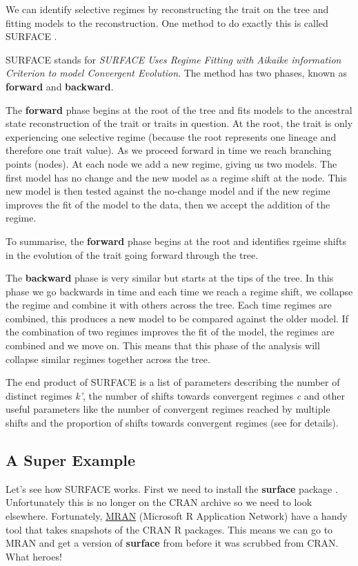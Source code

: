 \documentclass[
]{book}
\begin{document}
We can identify selective regimes by reconstructing the trait on the tree and fitting models to the reconstruction. One method to do exactly this is called SURFACE \citep{surface}.

SURFACE stands for \emph{SURFACE Uses Regime Fitting with Aikaike information Criterion to model Convergent Evolution}. The method has two phases, known as \textbf{forward} and \textbf{backward}.

The \textbf{forward} phase begins at the root of the tree and fits models to the ancestral state reconstruction of the trait or traits in question. At the root, the trait is only experiencing one selective regime (because the root represents one lineage and therefore one trait value). As we proceed forward in time we reach branching points (nodes). At each node we add a new regime, giving us two models. The first model has no change and the new model as a regime shift at the node. This new model is then tested against the no-change model and if the new regime improves the fit of the model to the data, then we accept the addition of the regime.

To summarise, the \textbf{forward} phase begins at the root and identifies rgeime shifts in the evolution of the trait going forward through the tree.

The \textbf{backward} phase is very similar but starts at the tips of the tree. In this phase we go backwards in time and each time we reach a regime shift, we collapse the regime and combine it with others across the tree. Each time regimes are combined, this produces a new model to be compared against the older model. If the combination of two regimes improves the fit of the model, the regimes are combined and we move on. This means that this phase of the analysis will collapse similar regimes together across the tree.

The end product of SURFACE is a list of parameters describing the number of distinct regimes \emph{k'}, the number of shifts towards convergent regimes \emph{c} and other useful parameters like the number of convergent regimes reached by multiple shifts and the proportion of shifts towards convergent regimes (see \citep{surface} for details).

\hypertarget{a-super-example}{%
\subsection{A Super Example}\label{a-super-example}}

Let's see how SURFACE works. First we need to install the \textbf{surface} package \citep{surface}. Unfortunately this is no longer on the CRAN archive so we need to look elsewhere. Fortunately, \href{https://mran.microsoft.com/}{MRAN} (Microsoft R Application Network) have a handy tool that takes snapshots of the CRAN R packages. This means we can go to MRAN and get a version of \textbf{surface} from before it was scrubbed from CRAN. What heroes!
\end{document}
